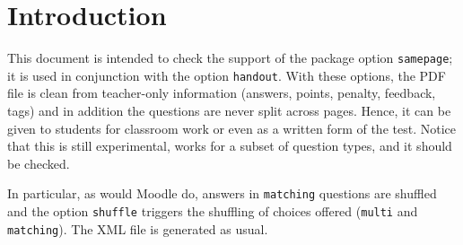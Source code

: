 \documentclass{article}
\begin{document}
\section*{Introduction}

This document is intended to check the support of the package option
\texttt{samepage}; it is used in conjunction with the option \texttt{handout}.
With these options, the PDF file is clean from teacher-only
information (answers, points, penalty, feedback, tags) and in addition
the questions are never split across pages.  Hence, it can be given
to students for classroom work or even as a written form of the test.
Notice that this is still experimental, works for a subset of question types,
and it should be checked.

In particular, as would Moodle do,
answers in \texttt{matching} questions are shuffled and the option
\texttt{shuffle} triggers the shuffling of choices offered (\texttt{multi} and
\texttt{matching}). The XML file is generated as usual.
\end{document}
